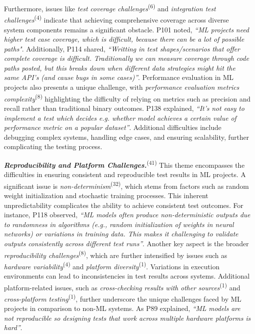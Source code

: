 Furthermore, issues like \textit{test coverage challenges}\textsuperscript{(6)} and \textit{integration test challenges}\textsuperscript{(4)} indicate that achieving comprehensive coverage across diverse system components remains a significant obstacle.
P101 noted, \textit{``ML projects need higher test case coverage, which is difficult, because there can be a lot of possible paths"}. Additionally, P114 shared, \textit{``Writting in test shapes/scenarios that offer complete coverage is difficult. Traditionally we can measure coverage through code paths posted, but this breaks down when different data strategies might hit the same API's (and cause bugs in some cases)''}.
Performance evaluation in ML projects also presents a unique challenge, with \textit{performance evaluation metrics complexity}\textsuperscript{(8)} highlighting the difficulty of relying on metrics such as precision and recall rather than traditional binary outcomes. P138 explained, \textit{``It's not easy to implement a test which decides e.g. whether model achieves a certain value of performance metric on a popular dataset''}.
Additional difficulties include debugging complex systems, handling edge cases, and ensuring scalability, further complicating the testing process.


\textbf{\textit{Reproducibility and Platform Challenges.}}\textsuperscript{(41)}
This theme encompasses the difficulties in ensuring consistent and reproducible test results in ML projects. A significant issue is \textit{non-determinism}\textsuperscript{(32)}, which stems from factors such as random weight initialization and stochastic training processes. This inherent unpredictability complicates the ability to achieve consistent test outcomes. For instance, P118 observed, \textit{``ML models often produce non-deterministic outputs due to randomness in algorithms (e.g., random initialization of weights in neural networks) or variations in training data. This makes it challenging to validate outputs consistently across different test runs''}.
Another key aspect is the broader \textit{reproducibility challenges}\textsuperscript{(8)}, which are further intensified by issues such as \textit{hardware variability}\textsuperscript{(4)} and \textit{platform diversity}\textsuperscript{(1)}. Variations in execution environments can lead to inconsistencies in test results across systems. Additional platform-related issues, such as \textit{cross-checking results with other sources}\textsuperscript{(1)} and \textit{cross-platform testing}\textsuperscript{(1)}, further underscore the unique challenges faced by ML projects in comparison to non-ML systems.
As P89 explained, \textit{``ML models are not reproducible so designing tests that work across multiple hardware platforms is hard''}.

